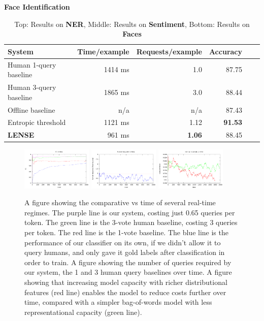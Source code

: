 \begin{table}[s]
{\bf Face Identification}\\
\begin{tabular}{l  r  r  r  r  r}
    \textbf{System} & \textbf{Time/example} & \textbf{Requests/example} & \textbf{Accuracy} \\ \hline
    Human 1-query baseline & 1414 ms & 1.0 & 87.75 \\ %
    Human 3-query baseline & 1865 ms & 3.0 & 88.44 \\ %
    Offline baseline & n/a & n/a & 87.43 \\    %
    Entropic threshold & 1121 ms & 1.12 & \textbf{91.53} \\ %
    \textbf{LENSE} & 961 ms & \textbf{1.06} & 88.45 \\   %
\end{tabular}
  \caption{Top: Results on {\bf NER}, Middle: Results on {\bf Sentiment}, Bottom: Results on {\bf Faces}}
  \label{tbl:results}
\end{table}
\begin{figure}[t]
  \begin{centering}
  \includegraphics[width=0.3\textwidth]{figures/ner_2_class/f1_plot/f1_vs_time.pdf}
  \includegraphics[width=0.3\textwidth]{figures/ner_2_class/cost_plot/cost_vs_time.pdf}
  \includegraphics[width=0.3\textwidth]{figures/sentiment_cost_per_token_vs_time/cost_per_token_vs_time.pdf}
  \end{centering}
  \caption{A figure showing the comparative \fone vs time of several real-time regimes. The purple line is our system, costing just 0.65 queries per token. The green line is the 3-vote human baseline, costing 3 queries per token. The red line is the 1-vote baseline. The blue line is the performance of our classifier on its own, if we didn't allow it to query humans, and only gave it gold labels after classification in order to train.
           A figure showing the number of queries required by our system, the 1 and 3 human query baselines over time.
           A figure showing that increasing model capacity with richer distributional features (red line) enables the model to reduce costs further over time, compared with a simpler bag-of-words model with less representational capacity (green line).}
\end{figure}


